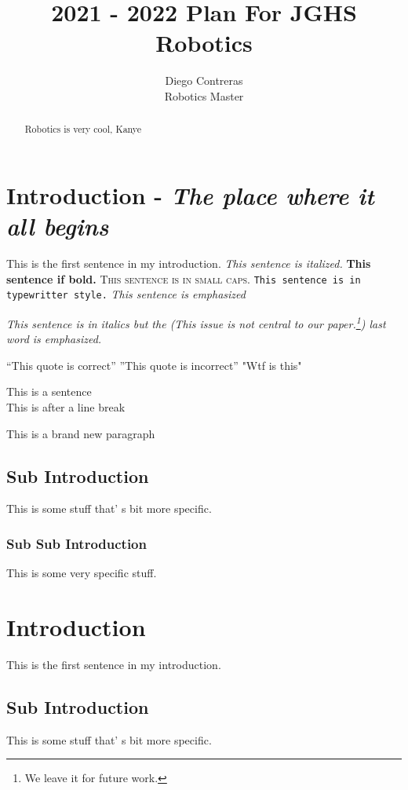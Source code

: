 \documentclass{article}
\title{2021 - 2022 Plan For JGHS Robotics}
\author{Diego Contreras \\ Robotics Master}
\begin{document}
\maketitle

\newpage
\tableofcontents

\newpage

\begin{abstract}
Robotics is very cool, Kanye
\end{abstract}

\newpage

\section{Introduction - \textit{The place where it all begins}}
This is the first sentence in my introduction. \textit{This sentence is italized.} \textbf{This sentence if bold.} \textsc{This sentence is in small caps.} \texttt{This sentence is in typewritter style.} \emph{This sentence is emphasized}

\textit{This sentence is in italics but the (This issue is not central to our paper.\footnote{We leave it for future work.}) last word is \emph{emphasized}.}

``This quote is correct''
''This quote is incorrect''
"Wtf is this"

This is a sentence\\
This is after a line break

This is a brand new paragraph


\subsection{Sub Introduction}
This is some stuff that' s bit more specific.

\subsubsection{Sub Sub Introduction}
This is some very specific stuff.


\section*{Introduction}
This is the first sentence in my introduction.

\subsection*{Sub Introduction}
This is some stuff that' s bit more specific.
\end{document}
